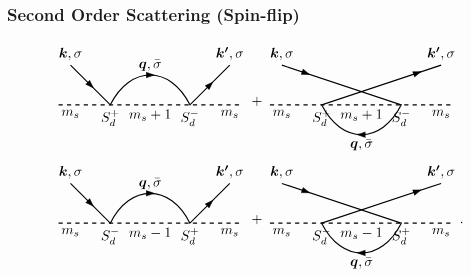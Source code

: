 \documentclass[10pt,aspectratio=43,xcolor=x11names,t]{beamer}%
\begin{document}
		\begin{frame}\frametitle{Second Order Scattering (Spin-flip)}
			\begin{align*}
				&\begin{tikzpicture}[baseline]
					\draw[thick,dashed] (-2.3,0)--(2.3,0);
					\draw[thick] (-2,1)--(-1,0) .. controls (-0.5,1) and (0.5,1) ..(1,0)--(2,1);
					\node[below] at (-2,0) {$m_s$};
					\node[below] at (0,0) {$m_s+1$};
					\node[below] at (2,0) {$m_s$};
					\node[below] at (1,0) {$S_d^-$};
					\node[below] at (-1,0) {$S_d^+$};
					\node[rotate=-45] at (-1.5,0.5) {\arrow};
					\node at (0,0.75) {\arrow};
					\node at (0,1) {$\bm{q},\bar{\sigma}$};
					\node[above] at (-2,1) {$\bm{k},\sigma$};
					\node[above] at (2,1) {$\bm{k'},\sigma$};
					\node[rotate=45] at (1.5,0.5) {\arrow};
				\end{tikzpicture}+\begin{tikzpicture}[baseline]
					\draw[thick,dashed] (-2.3,0)--(2.3,0);
					\draw[thick] (-2,1)--(1,0) .. controls (0.5,-1) and (-0.5,-1) .. (-1,0)--(2,1);
					\node[below] at (-2,0) {$m_s$};
					\node[below] at (0,0) {$m_s+1$};
					\node[below] at (2,0) {$m_s$};
					\node[below] at (1,0) {$S_d^-$};
					\node[below] at (-1,0) {$S_d^+$};
					\node[rotate=-20] at (-1.4,0.8) {\arrow};
					\node[rotate=180] at (0,-0.75) {\arrow};
					\node at (0,-1) {$\bm{q},\bar\sigma$};
					\node[above] at (-2,1) {$\bm{k},\sigma$};
					\node[above] at (2,1) {$\bm{k'},\sigma$};
					\node[rotate=20] at (1.4,0.8) {\arrow};
				\end{tikzpicture}\\
				&\begin{tikzpicture}[baseline]
					\draw[thick,dashed] (-2.3,0)--(2.3,0);
					\draw[thick] (-2,1)--(-1,0) .. controls (-0.5,1) and (0.5,1) ..(1,0)--(2,1);
					\node[below] at (-2,0) {$m_s$};
					\node[below] at (0,0) {$m_s-1$};
					\node[below] at (2,0) {$m_s$};
					\node[below] at (1,0) {$S_d^+$};
					\node[below] at (-1,0) {$S_d^-$};
					\node[rotate=-45] at (-1.5,0.5) {\arrow};
					\node at (0,0.75) {\arrow};
					\node at (0,1) {$\bm{q},\bar{\sigma}$};
					\node[above] at (-2,1) {$\bm{k},\sigma$};
					\node[above] at (2,1) {$\bm{k'},\sigma$};
					\node[rotate=45] at (1.5,0.5) {\arrow};
				\end{tikzpicture}+
				\begin{tikzpicture}[baseline]
					\draw[thick,dashed] (-2.3,0)--(2.3,0);
					\draw[thick] (-2,1)--(1,0) .. controls (0.5,-1) and (-0.5,-1) .. (-1,0)--(2,1);
					\node[below] at (-2,0) {$m_s$};
					\node[below] at (0,0) {$m_s-1$};
					\node[below] at (2,0) {$m_s$};
					\node[below] at (1,0) {$S_d^+$};
					\node[below] at (-1,0) {$S_d^-$};
					\node[rotate=-20] at (-1.4,0.8) {\arrow};
					\node[rotate=180] at (0,-0.75) {\arrow};
					\node at (0,-1) {$\bm{q},\bar\sigma$};
					\node[above] at (-2,1) {$\bm{k},\sigma$};
					\node[above] at (2,1) {$\bm{k'},\sigma$};
					\node[rotate=20] at (1.4,0.8) {\arrow};
				\end{tikzpicture}.
			\end{align*}
		\end{frame}
\end{document}
